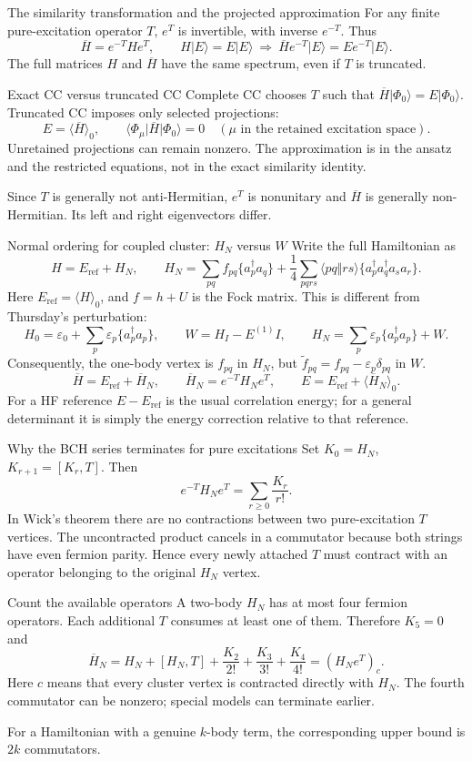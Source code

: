 \documentclass[aspectratio=169,10pt]{beamer}
\newcommand{\ket}[1]{\vert #1\rangle}
\newcommand{\mel}[3]{\langle #1\lvert #2\rvert #3\rangle}
\newcommand{\av}[1]{\langle #1\rangle_0}
\newcommand{\cre}[1]{a_{#1}^{\dagger}}
\newcommand{\ann}[1]{a_{#1}}
\newcommand{\no}[1]{\bigl\{#1\bigr\}}
\newcommand{\Eref}{E_{\mathrm{ref}}}
\newcommand{\ph}{\Phi_0}
\newcommand{\Hbar}{\overline{H}}
\newcommand{\as}[4]{\langle #1#2\Vert #3#4\rangle}
\begin{document}
\begin{frame}{The similarity transformation and the projected approximation}
For any finite pure-excitation operator $T$, $e^T$ is invertible, with inverse $e^{-T}$. Thus
\[
 \Hbar=e^{-T}He^T,\qquad
 H\ket{E}=E\ket{E}\ \Longrightarrow\
 \Hbar e^{-T}\ket{E}=E e^{-T}\ket{E}.
\]
The full matrices $H$ and $\Hbar$ have the same spectrum, even if $T$ is truncated.
\begin{block}{Exact CC versus truncated CC}
Complete CC chooses $T$ such that $\Hbar\ket{\ph}=E\ket{\ph}$. Truncated CC imposes only selected projections:
\[
 E=\av{\Hbar},\qquad \mel{\Phi_\mu}{\Hbar}{\ph}=0
 \quad(\mu\text{ in the retained excitation space}).
\]
Unretained projections can remain nonzero. The approximation is in the ansatz and the restricted equations, not in the exact similarity identity.
\end{block}
Since $T$ is generally not anti-Hermitian, $e^T$ is nonunitary and $\Hbar$ is generally non-Hermitian. Its left and right eigenvectors differ.
\end{frame}

\begin{frame}{Normal ordering for coupled cluster: $H_N$ versus $W$}
Write the full Hamiltonian as
\[
 H=\Eref+H_N,\qquad
 H_N=\sum_{pq}f_{pq}\no{\cre{p}\ann{q}}
 +\frac14\sum_{pqrs}\as{p}{q}{r}{s}\no{\cre{p}\cre{q}\ann{s}\ann{r}}.
\]
Here $\Eref=\av H$, and $f=h+U$ is the Fock matrix. This is different from Thursday's perturbation:
\[
 H_0=\varepsilon_0+\sum_p\varepsilon_p\no{\cre p\ann p},\qquad
 W=H_I-E^{(1)}I,\qquad
 H_N=\sum_p\varepsilon_p\no{\cre p\ann p}+W.
\]
Consequently, the one-body vertex is $f_{pq}$ in $H_N$, but $\tilde f_{pq}=f_{pq}-\varepsilon_p\delta_{pq}$ in $W$.
\[
 \Hbar=\Eref+\Hbar_N,\qquad \Hbar_N=e^{-T}H_Ne^T,
 \qquad E=\Eref+\av{\Hbar_N}.
\]
For a HF reference $E-\Eref$ is the usual correlation energy; for a general determinant it is simply the energy correction relative to that reference.
\end{frame}


\begin{frame}{Why the BCH series terminates for pure excitations}
\small
Set $K_0=H_N$, $K_{r+1}=[K_r,T]$. Then
\[
 e^{-T}H_Ne^T=\sum_{r\ge0}\frac{K_r}{r!}.
\]
In Wick's theorem there are no contractions between two pure-excitation $T$ vertices. The uncontracted product cancels in a commutator because both strings have even fermion parity. Hence every newly attached $T$ must contract with an operator belonging to the original $H_N$ vertex.
\begin{block}{Count the available operators}
A two-body $H_N$ has at most four fermion operators. Each additional $T$ consumes at least one of them. Therefore $K_5=0$ and
\[
 \boxed{\Hbar_N=H_N+[H_N,T]+\frac{K_2}{2!}+\frac{K_3}{3!}+\frac{K_4}{4!}
 =(H_Ne^T)_c.}
\]
Here $c$ means that every cluster vertex is contracted directly with $H_N$. The fourth commutator can be nonzero; special models can terminate earlier.
\end{block}
For a Hamiltonian with a genuine $k$-body term, the corresponding upper bound is $2k$ commutators.
\end{frame}
\end{document}
